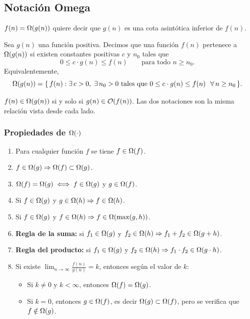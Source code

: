 \documentclass[11pt,letterpaper]{article}
\begin{document}
\subsection*{Notación Omega}

$f(n) = \Omega\!\left(g(n)\right)$ quiere decir que $g(n)$ es una cota asintótica
inferior de $f(n)$.

\begin{definicion}
  Sea $g(n)$ una función positiva. Decimos que una función $f(n)$
  pertenece a $\Omega\!\left(g(n)\right)$ si existen constantes positivas $c$ y $n_0$
  tales que
  \[
    0 \leq c \cdot g(n) \leq f(n) \qquad \text{para todo } n \geq n_0 .
  \]
  Equivalentemente,
  \[
    \Omega\!\left(g(n)\right) = \{\, f(n) : \exists\, c > 0,\; \exists\, n_0 > 0
    \ \text{tales que}\ 0 \leq c \cdot g(n) \leq f(n)
    \ \ \forall\, n \geq n_0 \,\}.
  \]
\end{definicion}

\begin{ojo}
    $f(n) \in \Omega\!\left(g(n)\right)$ si y solo si $g(n) \in \mathcal{O}\!\left(f(n)\right)$. Las dos
    notaciones son la misma relación vista desde cada lado.
\end{ojo}

\subsubsection*{Propiedades de $\Omega\!\left(\cdot\right)$}

\begin{enumerate}[itemsep=0.15em]
    \item Para cualquier función $f$ se tiene $f \in \Omega\!\left(f\right)$.
    \item $f \in \Omega\!\left(g\right) \Rightarrow \Omega\!\left(f\right) \subset \Omega\!\left(g\right)$.
    \item $\Omega\!\left(f\right) = \Omega\!\left(g\right) \iff f \in \Omega\!\left(g\right)$ y $g \in \Omega\!\left(f\right)$.
    \item Si $f \in \Omega\!\left(g\right)$ y $g \in \Omega\!\left(h\right) \Rightarrow
          f \in \Omega\!\left(h\right)$.
    \item Si $f \in \Omega\!\left(g\right)$ y $f \in \Omega\!\left(h\right) \Rightarrow
          f \in \Omega\!\left(\max(g,h)\right)$.
    \item \textbf{Regla de la suma:} si $f_1 \in \Omega\!\left(g\right)$ y
          $f_2 \in \Omega\!\left(h\right) \Rightarrow f_1 + f_2 \in \Omega\!\left(g + h\right)$.
    \item \textbf{Regla del producto:} si $f_1 \in \Omega\!\left(g\right)$ y
          $f_2 \in \Omega\!\left(h\right) \Rightarrow
          f_1 \cdot f_2 \in \Omega\!\left(g \cdot h\right)$.
    \item Si existe $\displaystyle\lim_{n \to \infty} \frac{f(n)}{g(n)}
          = k$, entonces según el valor de $k$:
          \begin{itemize}[itemsep=0.05em]
              \item Si $k \neq 0$ y $k < \infty$, entonces
                    $\Omega\!\left(f\right) = \Omega\!\left(g\right)$.
              \item Si $k = 0$, entonces $g \in \Omega\!\left(f\right)$, es decir
                    $\Omega\!\left(g\right) \subset \Omega\!\left(f\right)$, pero se verifica que
                    $f \notin \Omega\!\left(g\right)$.
          \end{itemize}
\end{enumerate}
\end{document}
